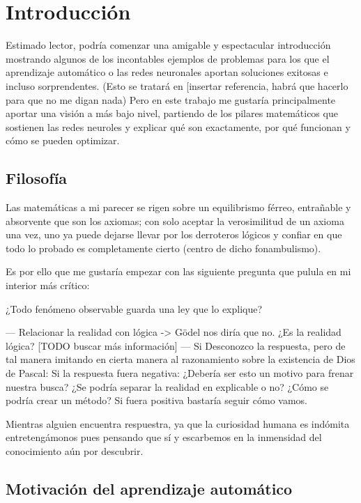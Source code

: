 
\chapter{Introducción}\label{ch:introduccion}

Estimado lector, podría comenzar una amigable y espectacular introducción mostrando algunos de los incontables ejemplos 
de problemas para los que 
el aprendizaje automático o las redes neuronales aportan soluciones exitosas e incluso sorprendentes. (Esto se tratará en 
[insertar referencia, habrá que hacerlo para que no me digan nada)
Pero en este trabajo me gustaría principalmente aportar una visión a más bajo nivel, partiendo de los pilares matemáticos 
que sostienen
las redes neuroles y explicar qué son exactamente, por qué funcionan y cómo se pueden optimizar. 

\section{Filosofía}
Las matemáticas a mi parecer se rigen sobre un equilibrismo férreo, entrañable y absorvente que son los axiomas;
con solo aceptar la verosimilitud de un axioma una vez, uno ya puede dejarse llevar por los derroteros
lógicos y confiar en que todo lo probado es completamente cierto (centro de dicho fonambulismo).   

Es por ello que me gustaría empezar con las siguiente pregunta que pulula en mi interior más crítico: 

¿Todo fenómeno observable guarda una ley que lo explique? 

---
Relacionar la realidad con lógica -> Gödel nos diría que no. 
¿Es la realidad lógica? 
[TODO buscar más información] 
---
Si 
Desconozco la respuesta, pero de tal manera imitando en cierta manera al razonamiento sobre la existencia
de Dios de Pascal: 
Si la respuesta fuera negativa: ¿Debería ser esto un motivo para frenar nuestra busca? 
¿Se podría separar la realidad en explicable o no? ¿Cómo se podría crear un método?
Si fuera positiva bastaría seguir cómo vamos. 

Mientras alguien encuentra respuestra, ya que la curiosidad humana es indómita
 entretengámonos pues pensando que sí y escarbemos en la inmensidad del conocimiento 
aún por descubrir. 

\section{Motivación del aprendizaje automático}


